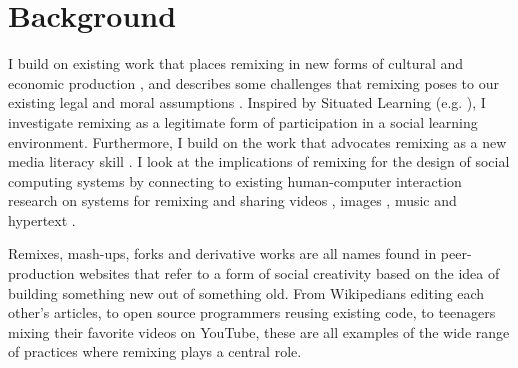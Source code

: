 \chapter{Background}


I build on existing work that places remixing in new forms of cultural and economic production \citep{benkler_wealth_2006,jenkins_convergence_2006,manovich_remix_2005,sinnreich_ethics_2009}, and describes some challenges that remixing poses to our existing legal and moral assumptions \citep{lessig_remix:_2008, posner_little_2007}.
Inspired by Situated Learning (e.g. \citet{lave_situated_1991}), I investigate remixing as a legitimate form of participation in a social learning environment.
Furthermore,  I build on the work that advocates remixing as a new media literacy skill \citep{ito_hanging_2010, jenkins_confronting_2009, livingstone_taking_2008, perkel_copy_2008}.
I look at the implications of remixing for the design of social computing systems by connecting to existing human-computer interaction research on systems for remixing and sharing videos \citep{diakopoulos_evolution_2007}, images \citep{seneviratne_policy-aware_2009}, music \citep{cheliotis_analysis_2009} and hypertext \citep{viegas_studying_2004}.

Remixes, mash-ups, forks and derivative works are all names found in peer-production websites that refer to a form of social creativity based on the idea of building something new out of something old.
From Wikipedians editing each other's articles, to open source programmers reusing existing code, to teenagers mixing their favorite videos on YouTube, these are all examples of the wide range of practices where remixing plays a central role.

